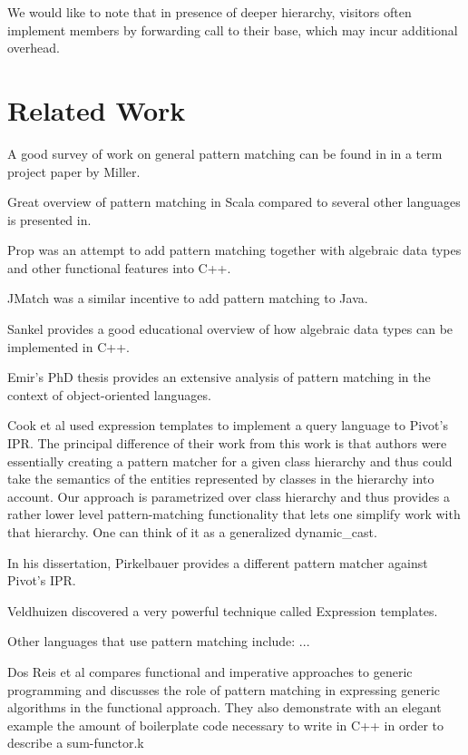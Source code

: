 \documentclass[preprint]{sigplanconf}
\begin{document}
We would like to note that in presence of deeper hierarchy, visitors often 
implement members by forwarding call to their base, which may incur additional 
overhead.

\section{Related Work} %
\label{sec:rw}

A good survey of work on general pattern matching can be found in in a term 
project paper by Miller\cite{Miller10}.

Great overview of pattern matching in Scala compared to several other languages 
is presented in\cite{ScalaPM}.

Prop was an attempt to add pattern matching together with algebraic data types 
and other functional features into C++\cite{Prop96}.

JMatch was a similar incentive to add pattern matching to Java.

Sankel provides a good educational overview of how algebraic data types can be 
implemented in C++\cite{SankelFP10,Sankel10}. 

Emir's PhD thesis provides an extensive analysis of pattern matching in the 
context of object-oriented languages\cite{EmirThesis}.

Cook et al used expression templates to implement a query language to Pivot's 
IPR\cite{iql04}. The principal difference of their work from this work is that 
authors were essentially creating a pattern matcher for a given class hierarchy 
and thus could take the semantics of the entities represented by classes in the 
hierarchy into account. Our approach is parametrized over class hierarchy and 
thus provides a rather lower level pattern-matching functionality that lets one 
simplify work with that hierarchy.  One can think of it as a generalized 
dynamic\_cast.

In his dissertation, Pirkelbauer provides a different pattern matcher against 
Pivot's IPR\cite{PirkelbauerThesis}.

Veldhuizen discovered a very powerful technique called Expression 
templates\cite{Veldhuizen95expressiontemplates}.

Other languages that use pattern matching include: ...

Dos Reis et al compares functional and imperative approaches to generic 
programming and discusses the role of pattern matching in expressing generic 
algorithms in the functional approach\cite{dos_reis:05:what_is_gp}. They also 
demonstrate with an elegant example the amount of boilerplate code necessary to 
write in C++ in order to describe a sum-functor.k
\end{document}

